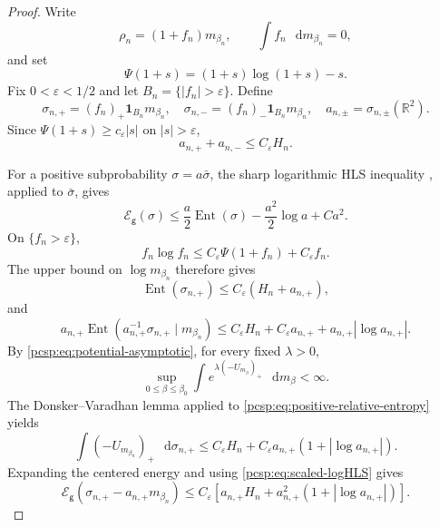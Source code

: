 \documentclass[11pt,reqno]{amsart}
\numberwithin{equation}{section}
\theoremstyle{plain}
\theoremstyle{definition}
\newcommand{\dd}{\mathop{}\!\mathrm d}
\newcommand{\R}{\mathbb R}
\newcommand{\one}{\mathbf 1}
\newcommand{\be}{\beta}
\newcommand{\g}{\mathsf g}
\newcommand{\Ent}{\operatorname{Ent}}
\newcommand{\Ecal}{\mathcal E}
\begin{document}
\begin{proof}
Write
\begin{equation}\label{pcsp:eq:f-perturbation}
 \rho_n=(1+f_n)m_{\be_n},
 \qquad
 \int f_n\,\dd m_{\be_n}=0,
\end{equation}
and set
\begin{equation}\label{pcsp:eq:Psi}
 \Psi(1+s)=(1+s)\log(1+s)-s.
\end{equation}
Fix $0<\varepsilon<1/2$ and let $B_n=\{|f_n|>\varepsilon\}$.  Define
\begin{equation}\label{pcsp:eq:bad-parts}
 \sigma_{n,+}=(f_n)_+\one_{B_n}m_{\be_n},
 \quad
 \sigma_{n,-}=(f_n)_-\one_{B_n}m_{\be_n},
 \quad
 a_{n,\pm}=\sigma_{n,\pm}(\R^2).
\end{equation}
Since $\Psi(1+s)\geq c_\varepsilon|s|$ on $|s|>\varepsilon$,
\begin{equation}\label{pcsp:eq:bad-masses}
 a_{n,+}+a_{n,-}\leq C_\varepsilon H_n.
\end{equation}

For a positive subprobability $\sigma=a\bar\sigma$, the sharp logarithmic HLS inequality \cite{CarlenLoss1992}, applied to $\bar\sigma$, gives
\begin{equation}\label{pcsp:eq:scaled-logHLS}
 \Ecal_\g(\sigma)
 \leq\frac a2\Ent(\sigma)-\frac{a^2}{2}\log a+Ca^2.
\end{equation}
On $\{f_n>\varepsilon\}$,
\begin{equation}\label{pcsp:eq:f-log-f}
 f_n\log f_n\leq C_\varepsilon\Psi(1+f_n)+C_\varepsilon f_n.
\end{equation}
The upper bound on $\log m_{\be_n}$ therefore gives
\begin{equation}\label{pcsp:eq:positive-subentropy}
 \Ent(\sigma_{n,+})\leq C_\varepsilon(H_n+a_{n,+}),
\end{equation}
and
\begin{equation}\label{pcsp:eq:positive-relative-entropy}
 a_{n,+}\Ent(a_{n,+}^{-1}\sigma_{n,+}\mid m_{\be_n})
 \leq C_\varepsilon H_n+C_\varepsilon a_{n,+}
 +a_{n,+}|\log a_{n,+}|.
\end{equation}
By \eqref{pcsp:eq:potential-asymptotic}, for every fixed $\lambda>0$,
\begin{equation}\label{pcsp:eq:potential-exponential}
 \sup_{0\leq\be\leq\be_0}
 \int e^{\lambda(-U_{m_\be})_+}\,\dd m_\be<\infty.
\end{equation}
The Donsker--Varadhan lemma applied to \eqref{pcsp:eq:positive-relative-entropy} yields
\begin{equation}\label{pcsp:eq:positive-potential-bound}
 \int(-U_{m_{\be_n}})_+\,\dd\sigma_{n,+}
 \leq C_\varepsilon H_n
 +C_\varepsilon a_{n,+}(1+|\log a_{n,+}|).
\end{equation}
Expanding the centered energy and using \eqref{pcsp:eq:scaled-logHLS} gives
\begin{equation}\label{pcsp:eq:positive-bad-energy}
 \Ecal_\g(\sigma_{n,+}-a_{n,+}m_{\be_n})
 \leq C_\varepsilon\left[
 a_{n,+}H_n+a_{n,+}^2(1+|\log a_{n,+}|)
 \right].
\end{equation}


\end{proof}
\end{document}
